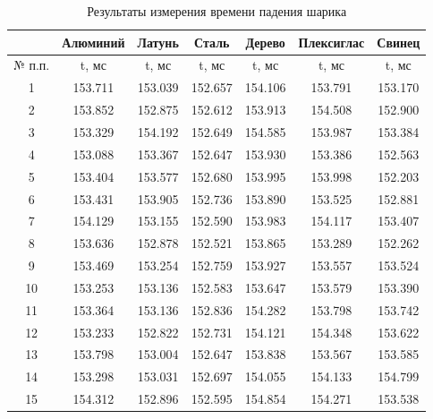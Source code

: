 \begin{center}
\begin{table}[H]
\centering
\caption{Результаты измерения времени падения шарика}
\label{tabl:2}
\renewcommand{\arraystretch}{1.15}
\begin{tabular}{|c|c|c|c|c|c|c|}
\hline
{} & Алюминий & Латунь & Сталь & Дерево & Плексиглас & Свинец \\
\hline
{} № п.п. & t, мс & t, мс & t, мс & t, мс & t, мс & t, мс \\
\hline
1  & 153.711 & 153.039 & 152.657 & 154.106 & 153.791 & 153.170 \\
2  & 153.852 & 152.875 & 152.612 & 153.913 & 154.508 & 152.900 \\
3  & 153.329 & 154.192 & 152.649 & 154.585 & 153.987 & 153.384 \\
4  & 153.088 & 153.367 & 152.647 & 153.930 & 153.386 & 152.563 \\
5  & 153.404 & 153.577 & 152.680 & 153.995 & 153.998 & 152.203 \\
6  & 153.431 & 153.905 & 152.736 & 153.890 & 153.525 & 152.881 \\
7  & 154.129 & 153.155 & 152.590 & 153.983 & 154.117 & 153.407 \\
8  & 153.636 & 152.878 & 152.521 & 153.865 & 153.289 & 152.262 \\
9  & 153.469 & 153.254 & 152.759 & 153.927 & 153.557 & 153.524 \\
10 & 153.253 & 153.136 & 152.583 & 153.647 & 153.579 & 153.390 \\
11 & 153.364 & 153.136 & 152.836 & 154.282 & 153.798 & 153.742 \\
12 & 153.233 & 152.822 & 152.731 & 154.121 & 154.348 & 153.622 \\
13 & 153.798 & 153.004 & 152.647 & 153.838 & 153.567 & 153.585 \\
14 & 153.298 & 153.031 & 152.697 & 154.055 & 154.133 & 154.799 \\
15 & 154.312 & 152.896 & 152.595 & 154.854 & 154.271 & 153.538 \\
\hline
\end{tabular}
\end{table}
\end{center}







